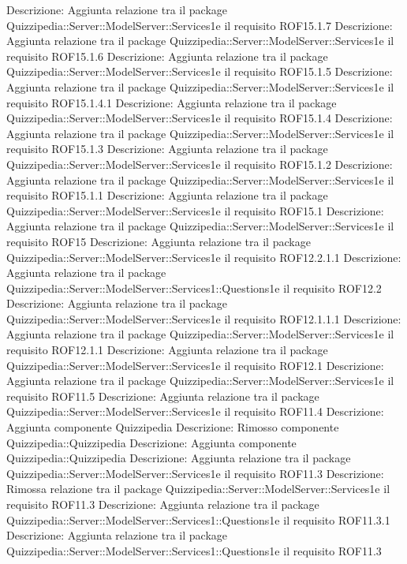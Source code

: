 Descrizione: Aggiunta relazione tra il package Quizzipedia::Server::ModelServer::Services1e il requisito ROF15.1.7 
Descrizione: Aggiunta relazione tra il package Quizzipedia::Server::ModelServer::Services1e il requisito ROF15.1.6 
Descrizione: Aggiunta relazione tra il package Quizzipedia::Server::ModelServer::Services1e il requisito ROF15.1.5 
Descrizione: Aggiunta relazione tra il package Quizzipedia::Server::ModelServer::Services1e il requisito ROF15.1.4.1 
Descrizione: Aggiunta relazione tra il package Quizzipedia::Server::ModelServer::Services1e il requisito ROF15.1.4 
Descrizione: Aggiunta relazione tra il package Quizzipedia::Server::ModelServer::Services1e il requisito ROF15.1.3 
Descrizione: Aggiunta relazione tra il package Quizzipedia::Server::ModelServer::Services1e il requisito ROF15.1.2 
Descrizione: Aggiunta relazione tra il package Quizzipedia::Server::ModelServer::Services1e il requisito ROF15.1.1 
Descrizione: Aggiunta relazione tra il package Quizzipedia::Server::ModelServer::Services1e il requisito ROF15.1 
Descrizione: Aggiunta relazione tra il package Quizzipedia::Server::ModelServer::Services1e il requisito ROF15 
Descrizione: Aggiunta relazione tra il package Quizzipedia::Server::ModelServer::Services1e il requisito ROF12.2.1.1 
Descrizione: Aggiunta relazione tra il package Quizzipedia::Server::ModelServer::Services1::Questions1e il requisito ROF12.2 
Descrizione: Aggiunta relazione tra il package Quizzipedia::Server::ModelServer::Services1e il requisito ROF12.1.1.1 
Descrizione: Aggiunta relazione tra il package Quizzipedia::Server::ModelServer::Services1e il requisito ROF12.1.1 
Descrizione: Aggiunta relazione tra il package Quizzipedia::Server::ModelServer::Services1e il requisito ROF12.1 
Descrizione: Aggiunta relazione tra il package Quizzipedia::Server::ModelServer::Services1e il requisito ROF11.5 
Descrizione: Aggiunta relazione tra il package Quizzipedia::Server::ModelServer::Services1e il requisito ROF11.4 
Descrizione: Aggiunta componente Quizzipedia 
Descrizione: Rimosso componente Quizzipedia::Quizzipedia 
Descrizione: Aggiunta componente Quizzipedia::Quizzipedia 
Descrizione: Aggiunta relazione tra il package Quizzipedia::Server::ModelServer::Services1e il requisito ROF11.3 
Descrizione: Rimossa relazione tra il package Quizzipedia::Server::ModelServer::Services1e il requisito ROF11.3 
Descrizione: Aggiunta relazione tra il package Quizzipedia::Server::ModelServer::Services1::Questions1e il requisito ROF11.3.1 
Descrizione: Aggiunta relazione tra il package Quizzipedia::Server::ModelServer::Services1::Questions1e il requisito ROF11.3 
